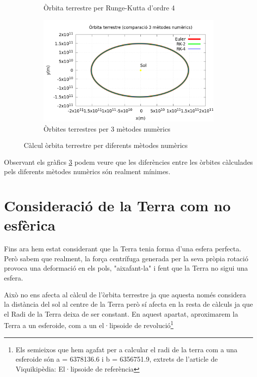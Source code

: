 \documentclass[11pt]{article}
\begin{document}
\begin{figure}[hbt!]
\begin{subfigure}{0.5\textwidth}
        \caption{Òrbita terrestre per Runge-Kutta d'ordre 4}
        \label{fig: orbitaRK4}
    \end{subfigure}
    \vspace{0.01\textwidth}%
    \begin{subfigure}{0.5\textwidth}
        \centering
        \includegraphics[width=\textwidth]{orbita3met.PNG}
        \caption{Òrbites terrestres per 3 mètodes numèrics}
        \label{fig: orbita3met}
    \end{subfigure}
    \caption{Càlcul òrbita terrestre per diferents mètodes numèrics}
    \label{fig: grafics3met}
\end{figure}

Observant els gràfics \ref{fig: grafics3met} podem veure que les diferències entre les òrbites càlculades pels diferents mètodes numèrics són realment mínimes.

\section{Consideració de la Terra com no esfèrica}\label{sec: terranoesfera}
Fins ara hem estat considerant que la Terra tenia forma d'una esfera perfecta. Però sabem que realment, la força centrífuga generada per la seva pròpia rotació provoca una deformació en els pols, "aixafant-la" i fent que la Terra no sigui una esfera.

Això no ens afecta al càlcul de l'òrbita terrestre ja que aquesta només considera la distància del sol al centre de la Terra però sí afecta en la resta de càlculs ja que el Radi de la Terra deixa de ser constant. En aquest apartat, aproximarem la Terra a un esferoide, com a un el·lipsoide de revolució\footnote{\label{nota: elipsoide}Els semieixos que hem agafat per a calcular el radi de la terra com a una esferoide són a = 6378136.6 i b = 6356751.9, extrets de l'article de Viquikipèdia: El·lipsoide de referència}
\end{document}

